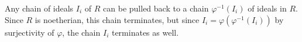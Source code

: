 Any chain of ideals $I_i$ of $R$ can be pulled back to a chain
$\varphi^{-1}(I_i)$ of ideals in $R$. Since $R$ is noetherian, this chain terminates,
but since $I_i = \varphi(\varphi^{-1}(I_i))$ by surjectivity of $\varphi$,
the chain $I_i$ terminates as well.
